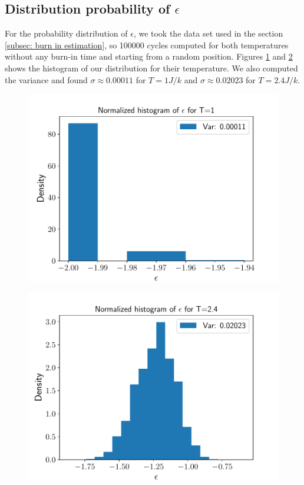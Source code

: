 \documentclass[english,notitlepage,reprint,nofootinbib]{revtex4-2}  %
\begin{document}
	\subsection{Distribution probability of $\epsilon$}\label{subsec:dist probability}

	For the probability distribution of $\epsilon$, we took the data set used in the section
	\ref{subsec: burn in estimation}, so 100000 cycles computed for both temperatures
	without any burn-in time and starting from a random position. Figures \ref{fig:hist1} and \ref{fig:hist2} shows the histogram of our distribution for their temperature.
	We also computed the variance and found $\sigma\approx0.00011$ for $T=1 J/k$ and
	$\sigma\approx0.02023$ for $T=2.4 J/k$.

	\begin{figure}[h!]
		\centering
		\includegraphics[scale=0.55]{figures/Histo_T1.pdf}
		\caption{}
		\label{fig:hist1}
	\end{figure}

	\begin{figure}[h!]
		\centering
		\includegraphics[scale=0.55]{figures/Histo_T2.pdf}
		\caption{}
		\label{fig:hist2}
	\end{figure}
\end{document}
